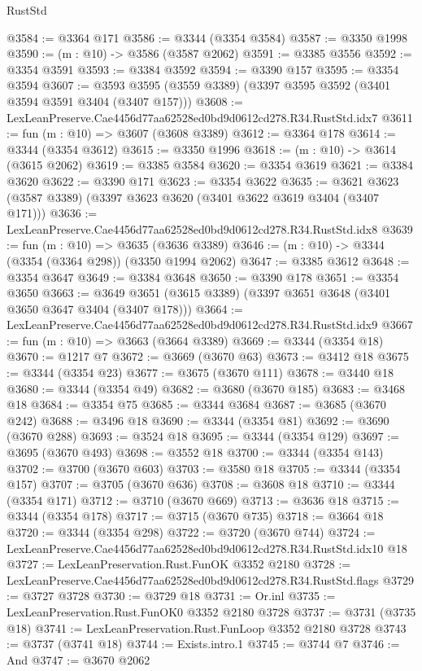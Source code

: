 \begin{lexlean}{RustStd}
\begin{coremodule}
@3584 := @3364 @171
@3586 := @3344 (@3354 @3584)
@3587 := @3350 @1998
@3590 := (m : @10) -> @3586 (@3587 @2062)
@3591 := @3385 @3556
@3592 := @3354 @3591
@3593 := @3384 @3592
@3594 := @3390 @157
@3595 := @3354 @3594
@3607 := @3593 @3595 (@3559 @3389) (@3397 @3595 @3592 (@3401 @3594 @3591 @3404 (@3407 @157)))
@3608 := LexLeanPreserve.Cae4456d77aa62528ed0bd9d0612cd278.R34.RustStd.idx7
@3611 := fun (m : @10) => @3607 (@3608 @3389)
@3612 := @3364 @178
@3614 := @3344 (@3354 @3612)
@3615 := @3350 @1996
@3618 := (m : @10) -> @3614 (@3615 @2062)
@3619 := @3385 @3584
@3620 := @3354 @3619
@3621 := @3384 @3620
@3622 := @3390 @171
@3623 := @3354 @3622
@3635 := @3621 @3623 (@3587 @3389) (@3397 @3623 @3620 (@3401 @3622 @3619 @3404 (@3407 @171)))
@3636 := LexLeanPreserve.Cae4456d77aa62528ed0bd9d0612cd278.R34.RustStd.idx8
@3639 := fun (m : @10) => @3635 (@3636 @3389)
@3646 := (m : @10) -> @3344 (@3354 (@3364 @298)) (@3350 @1994 @2062)
@3647 := @3385 @3612
@3648 := @3354 @3647
@3649 := @3384 @3648
@3650 := @3390 @178
@3651 := @3354 @3650
@3663 := @3649 @3651 (@3615 @3389) (@3397 @3651 @3648 (@3401 @3650 @3647 @3404 (@3407 @178)))
@3664 := LexLeanPreserve.Cae4456d77aa62528ed0bd9d0612cd278.R34.RustStd.idx9
@3667 := fun (m : @10) => @3663 (@3664 @3389)
@3669 := @3344 (@3354 @18)
@3670 := @1217 @7
@3672 := @3669 (@3670 @63)
@3673 := @3412 @18
@3675 := @3344 (@3354 @23)
@3677 := @3675 (@3670 @111)
@3678 := @3440 @18
@3680 := @3344 (@3354 @49)
@3682 := @3680 (@3670 @185)
@3683 := @3468 @18
@3684 := @3354 @75
@3685 := @3344 @3684
@3687 := @3685 (@3670 @242)
@3688 := @3496 @18
@3690 := @3344 (@3354 @81)
@3692 := @3690 (@3670 @288)
@3693 := @3524 @18
@3695 := @3344 (@3354 @129)
@3697 := @3695 (@3670 @493)
@3698 := @3552 @18
@3700 := @3344 (@3354 @143)
@3702 := @3700 (@3670 @603)
@3703 := @3580 @18
@3705 := @3344 (@3354 @157)
@3707 := @3705 (@3670 @636)
@3708 := @3608 @18
@3710 := @3344 (@3354 @171)
@3712 := @3710 (@3670 @669)
@3713 := @3636 @18
@3715 := @3344 (@3354 @178)
@3717 := @3715 (@3670 @735)
@3718 := @3664 @18
@3720 := @3344 (@3354 @298)
@3722 := @3720 (@3670 @744)
@3724 := LexLeanPreserve.Cae4456d77aa62528ed0bd9d0612cd278.R34.RustStd.idx10 @18
@3727 := LexLeanPreservation.Rust.FunOK @3352 @2180
@3728 := LexLeanPreserve.Cae4456d77aa62528ed0bd9d0612cd278.R34.RustStd.flags
@3729 := @3727 @3728
@3730 := @3729 @18
@3731 := Or.inl
@3735 := LexLeanPreservation.Rust.FunOK0 @3352 @2180 @3728
@3737 := @3731 (@3735 @18)
@3741 := LexLeanPreservation.Rust.FunLoop @3352 @2180 @3728
@3743 := @3737 (@3741 @18)
@3744 := Exists.intro.{1}
@3745 := @3744 @7
@3746 := And
@3747 := @3670 @2062

\end{coremodule}
\end{lexlean}

